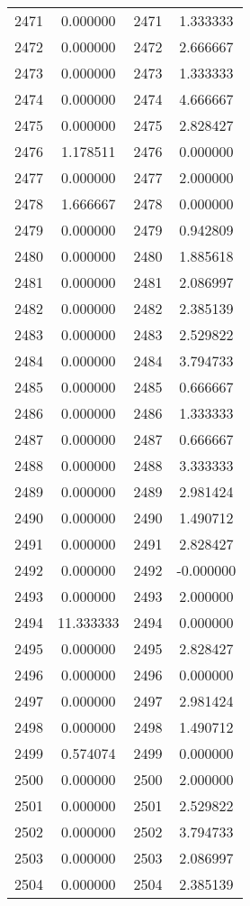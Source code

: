 \documentclass[12pt]{article}
\begin{document}
\begin{longtable}{@{}cccc@{}}
2471 & 0.000000 & 2471 & 1.333333 \\
2472 & 0.000000 & 2472 & 2.666667 \\
2473 & 0.000000 & 2473 & 1.333333 \\
2474 & 0.000000 & 2474 & 4.666667 \\
2475 & 0.000000 & 2475 & 2.828427 \\
2476 & 1.178511 & 2476 & 0.000000 \\
2477 & 0.000000 & 2477 & 2.000000 \\
2478 & 1.666667 & 2478 & 0.000000 \\
2479 & 0.000000 & 2479 & 0.942809 \\
2480 & 0.000000 & 2480 & 1.885618 \\
2481 & 0.000000 & 2481 & 2.086997 \\
2482 & 0.000000 & 2482 & 2.385139 \\
2483 & 0.000000 & 2483 & 2.529822 \\
2484 & 0.000000 & 2484 & 3.794733 \\
2485 & 0.000000 & 2485 & 0.666667 \\
2486 & 0.000000 & 2486 & 1.333333 \\
2487 & 0.000000 & 2487 & 0.666667 \\
2488 & 0.000000 & 2488 & 3.333333 \\
2489 & 0.000000 & 2489 & 2.981424 \\
2490 & 0.000000 & 2490 & 1.490712 \\
2491 & 0.000000 & 2491 & 2.828427 \\
2492 & 0.000000 & 2492 & -0.000000 \\
2493 & 0.000000 & 2493 & 2.000000 \\
2494 & 11.333333 & 2494 & 0.000000 \\
2495 & 0.000000 & 2495 & 2.828427 \\
2496 & 0.000000 & 2496 & 0.000000 \\
2497 & 0.000000 & 2497 & 2.981424 \\
2498 & 0.000000 & 2498 & 1.490712 \\
2499 & 0.574074 & 2499 & 0.000000 \\
2500 & 0.000000 & 2500 & 2.000000 \\
2501 & 0.000000 & 2501 & 2.529822 \\
2502 & 0.000000 & 2502 & 3.794733 \\
2503 & 0.000000 & 2503 & 2.086997 \\
2504 & 0.000000 & 2504 & 2.385139 \\

\end{longtable}
\end{document}
